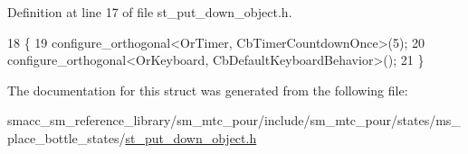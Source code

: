 Definition at line 17 of file st\+\_\+put\+\_\+down\+\_\+object.\+h.


\begin{DoxyCode}
18     \{
19         configure\_orthogonal<OrTimer,  CbTimerCountdownOnce>(5);   
20         configure\_orthogonal<OrKeyboard, CbDefaultKeyboardBehavior>();
21     \}
\end{DoxyCode}


The documentation for this struct was generated from the following file\+:\begin{DoxyCompactItemize}
\item 
smacc\+\_\+sm\+\_\+reference\+\_\+library/sm\+\_\+mtc\+\_\+pour/include/sm\+\_\+mtc\+\_\+pour/states/ms\+\_\+place\+\_\+bottle\+\_\+states/\hyperlink{st__put__down__object_8h}{st\+\_\+put\+\_\+down\+\_\+object.\+h}\end{DoxyCompactItemize}
